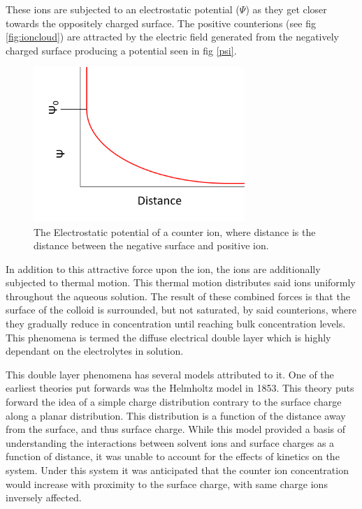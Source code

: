 These ions are subjected to an electrostatic potential ($\Psi$) as they get closer towards the oppositely charged surface. The positive counterions (see fig \ref{fig:ioncloud}) are attracted by the electric field generated from the negatively charged surface producing a potential seen in fig \ref{psi}. 

\begin{figure}[h]    
        \begin{center}
          \includegraphics[width=80mm]{chapter1/psi.PNG}
\end{center}
\caption{The Electrostatic potential of a counter ion, where distance is the distance between the negative surface and positive ion.}
\label{fig:psi}                
\end{figure}


In addition to this attractive force upon the ion, the ions are additionally subjected to thermal motion. This thermal motion distributes said ions uniformly throughout the aqueous solution. The result of these combined forces is that the surface of the colloid is surrounded, but not saturated, by said counterions, where they gradually reduce in concentration until reaching bulk concentration levels. This phenomena is termed the diffuse electrical double layer which is highly dependant on the electrolytes in solution.

This double layer phenomena has several models attributed to it. One of the earliest theories put forwards was the Helmholtz model in 1853. This theory puts forward the idea of a simple charge distribution contrary to the surface charge along a planar distribution. This distribution is a function of the distance away from the surface, and thus surface charge. While this model provided a basis of understanding the interactions between solvent ions and surface charges as a function of distance, it was unable to account for the effects of kinetics on the system. Under this system it was anticipated that the counter ion concentration would increase with proximity to the surface charge, with same charge ions inversely affected.

